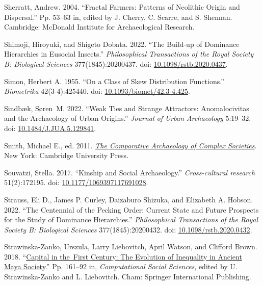 \documentclass[
  12pt,
]{book}
\newlength{\cslhangindent}
\newlength{\cslentryspacingunit} %
\newenvironment{CSLReferences}[2] %
 {%
  \setlength{\parindent}{0pt}
  \ifodd #1
  \let\oldpar\par
  \def\par{\hangindent=\cslhangindent\oldpar}
  \fi
  \setlength{\parskip}{#2\cslentryspacingunit}
 }%
 {}
\begin{document}
\begin{CSLReferences}{1}{0}
\leavevmode{}%
Sherratt, Andrew. 2004. {``Fractal Farmers: Patterns of Neolithic Origin and Dispersal.''} Pp. 53--63 in, edited by J. Cherry, C. Scarre, and S. Shennan. Cambridge: McDonald Institute for Archaeological Research.

\leavevmode{}%
Shimoji, Hiroyuki, and Shigeto Dobata. 2022. {``The Build-up of Dominance Hierarchies in Eusocial Insects.''} \emph{Philosophical Transactions of the Royal Society B: Biological Sciences} 377(1845):20200437. doi: \href{https://doi.org/10.1098/rstb.2020.0437}{10.1098/rstb.2020.0437}.

\leavevmode{}%
Simon, Herbert A. 1955. {``On a Class of Skew Distribution Functions.''} \emph{Biometrika} 42(3-4):425440. doi: \href{https://doi.org/10.1093/biomet/42.3-4.425}{10.1093/biomet/42.3-4.425}.

\leavevmode{}%
Sindbæk, Søren~M. 2022. {``Weak Ties and Strange Attractors: Anomalocivitas and the Archaeology of Urban Origins.''} \emph{Journal of Urban Archaeology} 5:19--32. doi: \href{https://doi.org/10.1484/J.JUA.5.129841}{10.1484/J.JUA.5.129841}.

\leavevmode{}%
Smith, Michael E., ed. 2011. \emph{\href{https://doi.org/10.1017/CBO9781139022712}{The Comparative Archaeology of Complex Societies}}. New York: Cambridge University Press.

\leavevmode{}%
Souvatzi, Stella. 2017. {``Kinship and Social Archaeology.''} \emph{Cross-cultural research} 51(2):172195. doi: \href{https://doi.org/10.1177/1069397117691028}{10.1177/1069397117691028}.

\leavevmode{}%
Strauss, Eli D., James P. Curley, Daizaburo Shizuka, and Elizabeth A. Hobson. 2022. {``The Centennial of the Pecking Order: Current State and Future Prospects for the Study of Dominance Hierarchies.''} \emph{Philosophical Transactions of the Royal Society B: Biological Sciences} 377(1845):20200432. doi: \href{https://doi.org/10.1098/rstb.2020.0432}{10.1098/rstb.2020.0432}.

\leavevmode{}%
Strawinska-Zanko, Urszula, Larry Liebovitch, April Watson, and Clifford Brown. 2018. {``\href{https://doi.org/10.1007/978-3-319-76765-9_9}{Capital in the~First Century: The Evolution of Inequality in Ancient Maya Society}.''} Pp. 161--92 in, \emph{Computational Social Sciences}, edited by U. Strawinska-Zanko and L. Liebovitch. Cham: Springer International Publishing.


\end{CSLReferences}
\end{document}
